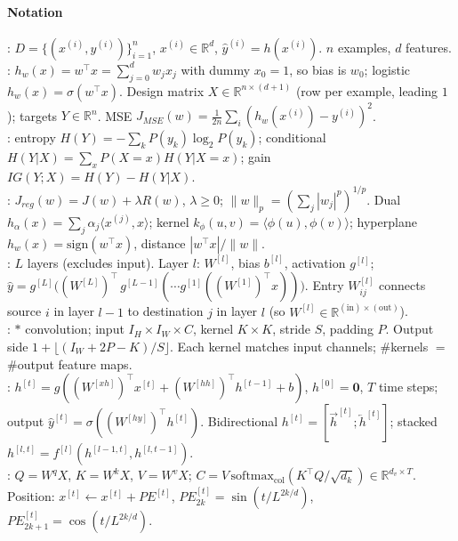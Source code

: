 \paragraph{Notation}
: $D=\{(x^{(i)},y^{(i)})\}_{i=1}^{n}$, $x^{(i)}\in\mathbb{R}^{d}$, $\hat y^{(i)}=h(x^{(i)})$. $n$ examples, $d$ features.\\
: $h_w(x)=w^{\top}x=\sum_{j=0}^{d}w_jx_j$ with dummy $x_0\!=\!1$, so bias is $w_0$; logistic $h_w(x)=\sigma(w^{\top}x)$. Design matrix $X\!\in\!\mathbb{R}^{n\times(d+1)}$ (row per example, leading $1$); targets $Y\!\in\!\mathbb{R}^{n}$. MSE $J_{MSE}(w)=\frac{1}{2n}\sum_i(h_w(x^{(i)})-y^{(i)})^{2}$.\\
: entropy $H(Y)=-\sum_k P(y_k)\log_2 P(y_k)$; conditional $H(Y|X)=\sum_x P(X{=}x)H(Y|X{=}x)$; gain $IG(Y;X)=H(Y)-H(Y|X)$.\\
: $J_{reg}(w)=J(w)+\lambda R(w)$, $\lambda\!\geq\!0$; $\|w\|_p=(\sum_j|w_j|^{p})^{1/p}$. Dual $h_\alpha(x)=\sum_j\alpha_j\langle x^{(j)},x\rangle$; kernel $k_\phi(u,v)=\langle\phi(u),\phi(v)\rangle$; hyperplane $h_w(x)=\mathrm{sign}(w^{\top}x)$, distance $|w^{\top}x|/\|w\|$.\\
: $L$ layers (excludes input). Layer $l$: $W^{[l]}$, bias $b^{[l]}$, activation $g^{[l]}$; $\hat y=g^{[L]}\!\big((W^{[L]})^{\top}\,g^{[L-1]}(\cdots g^{[1]}((W^{[1]})^{\top}x))\big)$. Entry $W^{[l]}_{ij}$ connects source $i$ in layer $l{-}1$ to destination $j$ in layer $l$ (so $W^{[l]}\!\in\!\mathbb{R}^{(\text{in})\times(\text{out})}$).\\
: $*$ convolution; input $I_H\!\times\!I_W\!\times\!C$, kernel $K\!\times\!K$, stride $S$, padding $P$. Output side $1+\lfloor(I_W+2P-K)/S\rfloor$. Each kernel matches input channels; \#kernels $=$ \#output feature maps.\\
: $h^{[t]}=g((W^{[xh]})^{\top}x^{[t]}+(W^{[hh]})^{\top}h^{[t-1]}+b)$, $h^{[0]}\!=\!\mathbf{0}$, $T$ time steps; output $\hat y^{[t]}=\sigma((W^{[hy]})^{\top}h^{[t]})$. Bidirectional $h^{[t]}=[\vec h^{[t]};\overleftarrow h^{[t]}]$; stacked $h^{[l,t]}=f^{[l]}(h^{[l-1,t]},h^{[l,t-1]})$.\\
: $Q\!=\!W^{q}X$, $K\!=\!W^{k}X$, $V\!=\!W^{v}X$; $C=V\,\mathrm{softmax}_{\mathrm{col}}(K^{\top}Q/\sqrt{d_k})\in\mathbb{R}^{d_v\times T}$. Position: $x^{[t]}\!\leftarrow\!x^{[t]}+PE^{[t]}$, $PE^{[t]}_{2k}=\sin(t/L^{2k/d})$, $PE^{[t]}_{2k+1}=\cos(t/L^{2k/d})$.


